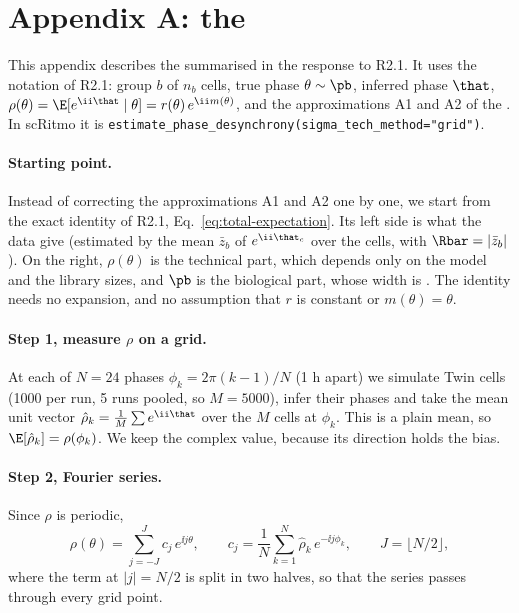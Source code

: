 \newpage
\section*{Appendix A: the \gridmethod}

This appendix describes the \gridmethod summarised in the response to R2.1. It uses the notation of R2.1: group $b$ of $n_b$ cells, true phase $\theta \sim \pb$, inferred phase $\that$, $\rho(\theta) = \E[e^{\ii\that} \mid \theta] = r(\theta)\, e^{\ii m(\theta)}$, and the approximations A1 and A2 of the \submethod. In scRitmo it is \texttt{estimate\_phase\_desynchrony(sigma\_tech\_method="grid")}.

\paragraph{Starting point.}

Instead of correcting the approximations A1 and A2 one by one, we start from the exact identity of R2.1, Eq.~\eqref{eq:total-expectation}. Its left side is what the data give (estimated by the mean $\bar z_b$ of $e^{\ii\that_c}$ over the cells, with $\Rbar = |\bar z_b|$). On the right, $\rho(\theta)$ is the technical part, which depends only on the model and the library sizes, and $\pb$ is the biological part, whose width is \sbiob. The identity needs no expansion, and no assumption that $r$ is constant or $m(\theta) = \theta$.

\paragraph{Step 1, measure $\rho$ on a grid.}

At each of $N = 24$ phases $\phi_k = 2\pi(k-1)/N$ (1 h apart) we simulate Twin cells (1000 per run, 5 runs pooled, so $M = 5000$), infer their phases and take the mean unit vector $\hat\rho_k = \frac{1}{M}\sum e^{\ii\that}$ over the $M$ cells at $\phi_k$. This is a plain mean, so $\E[\hat\rho_k] = \rho(\phi_k)$. We keep the complex value, because its direction holds the bias.

\paragraph{Step 2, Fourier series.}

Since $\rho$ is periodic,
\begin{equation}
\rho(\theta) = \sum_{j=-J}^{J} c_j\, e^{\ii j\theta},
\qquad
c_j = \frac{1}{N}\sum_{k=1}^{N} \hat\rho_k\, e^{-\ii j\phi_k},
\qquad J = \lfloor N/2 \rfloor ,
\label{eq:fourier}
\end{equation}
where the term at $|j| = N/2$ is split in two halves, so that the series passes through every grid point.

